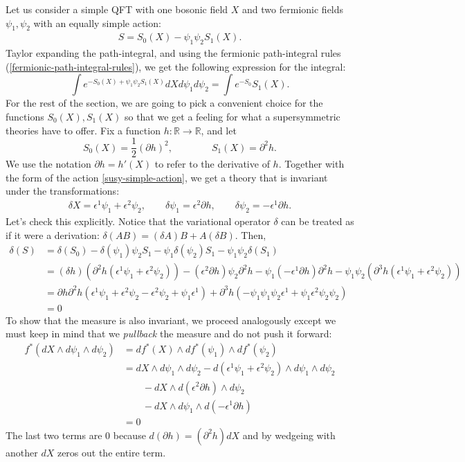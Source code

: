 \documentclass{report}
\theoremstyle{plain}
\theoremstyle{definition}
\theoremstyle{remark}
\newcommand{\di}{\partial}
\newcommand{\bR}{\mathbb{R}}
\newcommand{\FR}[2]{\frac{#1}{#2}}
\begin{document}
Let us consider a simple QFT with one bosonic field $X$ and two fermionic
fields $\psi_1,\psi_2$ with an equally simple action: 
\begin{align} S = S_0(X) - \psi_1\psi_2 S_1(X).
    \label{susy-simple-action}
\end{align}
Taylor expanding the path-integral, and using the fermionic path-integral
rules (\ref{fermionic-path-integral-rules}), we get the following
expression for the integral: \[ \int e^{-S_0(X)+\psi_1\psi_2S_1(X)}
dXd\psi_1d\psi_2 = \int e^{-S_0}S_1(X).\]
For the rest of the section, we are going to pick a convenient choice for
the functions $S_0(X), S_1(X)$ so that we get a feeling for what a
supersymmetric theories have to offer. Fix a function $h:\bR\to \bR$, and let
\[ S_0(X) = \FR{1}{2} (\di h)^2, \qquad\qquad S_1(X) = \di^2 h.\] We use
the notation $\di h = h'(X)$ to refer to the derivative of $h$.  Together
with the form of the action \eqref{susy-simple-action}, we get a theory
that is invariant under the transformations:
\begin{align}
\delta X = \epsilon^1\psi_1 + \epsilon^2\psi_2,
\qquad \delta\psi_1 = \epsilon^2\di h,
\qquad \delta\psi_2 =-\epsilon^1\di h.
\label{susy-simple-variation}
\end{align}
Let's check this explicitly. Notice that the variational operator $\delta$
can be treated as if it were a derivation: $\delta(AB) = (\delta A)B +
A(\delta B)$.  Then,
\begin{align*}
\delta(S) &= \delta(S_0) - \delta(\psi_1)\psi_2S_1 -
\psi_1\delta(\psi_2)S_1 - \psi_1\psi_2\delta(S_1)\\
&= (\delta h)(\di^2 h(\epsilon^1\psi_1+\epsilon^2\psi_2))
      -(\epsilon^2\di h)\psi_2\di^2 h
      -\psi_1(-\epsilon^1\di h)\di^2 h
      -\psi_1\psi_2(\di^3 h (\epsilon^1\psi_1+\epsilon^2\psi_2))\\
&=\di h\di^2 h
(\epsilon^1\psi_1+\epsilon^2\psi_2-\epsilon^2\psi_2+\psi_1\epsilon^1)
+\di^3 h (-\psi_1\psi_1\psi_2\epsilon^1 + \psi_1\epsilon^2\psi_2\psi_2)\\
&=0
\end{align*}
To show that the measure is also invariant, we proceed analogously except
we must keep in mind that we \emph{pullback} the measure and do not push it
forward:
\begin{align*}
f^*(dX\wedge d\psi_1\wedge d\psi_2)
&= df^*(X)\wedge df^*(\psi_1) \wedge df^*(\psi_2)\\
&= dX\wedge d\psi_1\wedge d\psi_2
  -d(\epsilon^1\psi_1+\epsilon^2\psi_2)\wedge d\psi_1\wedge d\psi_2\\
  &\qquad-dX\wedge d(\epsilon^2\di h)\wedge d\psi_2\\
  &\qquad-dX\wedge d\psi_1\wedge d(-\epsilon^1\di h)\\
&= 0
\end{align*}
The last two terms are $0$ because $d(\di h) = (\di^2 h)dX$ and by wedgeing
with another $dX$ zeros out the entire term.
\end{document}
